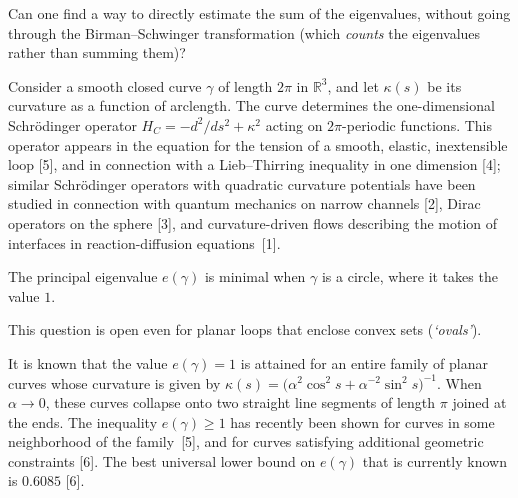 \documentclass[12pt,letterpaper, reqno]{aimpl}
\begin{document}
\begin{problemblock}


\begin{problem}[2.33]
 Can one find a way to directly
estimate the sum of the eigenvalues, without going through the
Birman--Schwinger transformation (which \emph{counts} the
eigenvalues rather than summing them)?
\end{problem}
\end{problemblock}

\begin{problemblock}
Consider a smooth closed curve $\gamma$ of length $2\pi$ in
${\mathbb R}^3$, and let  $\kappa(s)$ be its curvature as a function
of arclength. The curve determines the one-dimensional Schr\"odinger
operator $H_C=-d^2/ds^2 + \kappa^2$ acting on $2\pi$-periodic
functions. This operator appears in the equation for the tension of
a smooth, elastic, inextensible loop [5], and in connection with a
Lieb--Thirring inequality in one dimension [4]; similar
Schr\"odinger operators with quadratic curvature potentials have
been studied in connection with quantum mechanics on narrow channels
[2], Dirac operators on the sphere [3], and curvature-driven flows
describing the motion of interfaces in reaction-diffusion
equations~[1].

\begin{conjecture}[2.4]
The principal eigenvalue $e(\gamma)$ is
minimal when $\gamma$ is a circle, where it takes the value $1$.
\end{conjecture}

This question is open even for planar loops that enclose convex sets
(\emph{`ovals'}).

\begin{remark}
 It is known that the value $e(\gamma)=1$ is
attained for an entire family of planar curves whose curvature is
given by $\kappa(s) = \bigl(\alpha^2\cos^2 s + \alpha^{-2}\sin^2 s
\bigr)^{-1}$. When $\alpha\to 0$, these curves collapse onto two
straight line segments of length $\pi$ joined at the ends. The
inequality $e(\gamma)\ge 1$ has recently been shown for curves in
some neighborhood of the family~[5], and for curves satisfying
additional geometric constraints [6]. The best universal lower bound
on $e(\gamma)$ that is currently known is $0.6085$ [6].

\end{remark}


\end{problemblock}
\end{document}
